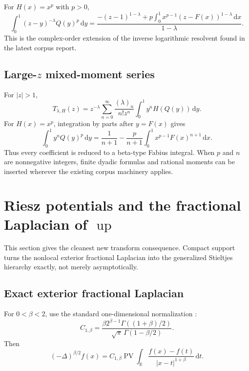 \documentclass[11pt,oneside]{article}
\numberwithin{equation}{section}
\theoremstyle{plain}
\theoremstyle{definition}
\theoremstyle{remark}
\newcommand{\R}{\mathbb R}
\newcommand{\Up}{\operatorname{up}}
\newcommand{\PV}{\operatorname{PV}}
\newcommand{\dd}{\,\mathrm d}
\begin{document}
For $H(x)=x^p$ with $p>0$,
\begin{equation}
 \int_0^1(z-y)^{-\lambda}Q(y)^p\dd y
 =\frac{-(z-1)^{1-\lambda}
  +p\int_0^1x^{p-1}(z-F(x))^{1-\lambda}\dd x}{1-\lambda}.
 \label{eq:Q-power-complex-resolvent}
\end{equation}
This is the complex-order extension of the inverse logarithmic resolvent found
in the latest corpus report.

\subsection{Large-\texorpdfstring{$z$}{z} mixed-moment series}

For $|z|>1$,
\begin{equation}
 T_{\lambda,H}(z)
 =z^{-\lambda}\sum_{n=0}^{\infty}
  \frac{(\lambda)_n}{n!z^n}
  \int_0^1y^nH(Q(y))\dd y.
 \label{eq:T-moment-series}
\end{equation}
For $H(x)=x^p$, integration by parts after $y=F(x)$ gives
\begin{equation}
 \int_0^1y^nQ(y)^p\dd y
 =\frac1{n+1}
  -\frac{p}{n+1}\int_0^1x^{p-1}F(x)^{n+1}\dd x.
 \label{eq:mixed-inverse-moment}
\end{equation}
Thus every coefficient is reduced to a beta-type Fabius integral.  When $p$
and $n$ are nonnegative integers, finite dyadic formulas and rational moments
can be inserted wherever the existing corpus machinery applies.

\section{Riesz potentials and the fractional Laplacian of \texorpdfstring{$\Up$}{up}}
\label{sec:Riesz}

This section gives the cleanest new transform consequence.  Compact support
turns the nonlocal exterior fractional Laplacian into the generalized
Stieltjes hierarchy exactly, not merely asymptotically.

\subsection{Exact exterior fractional Laplacian}

For $0<\beta<2$, use the standard one-dimensional normalization
\cite{Kwasnicki2017}:
\begin{equation}
 C_{1,\beta}
 =\frac{\beta2^{\beta-1}\Gamma((1+\beta)/2)}
       {\sqrt\pi\,\Gamma(1-\beta/2)}.
 \label{eq:C1beta}
\end{equation}
Then
\begin{equation}
 (-\Delta)^{\beta/2}f(x)
 =C_{1,\beta}\PV\int_{\R}
   \frac{f(x)-f(t)}{|x-t|^{1+\beta}}\dd t.
 \label{eq:frac-lap-singular}
\end{equation}
\end{document}

